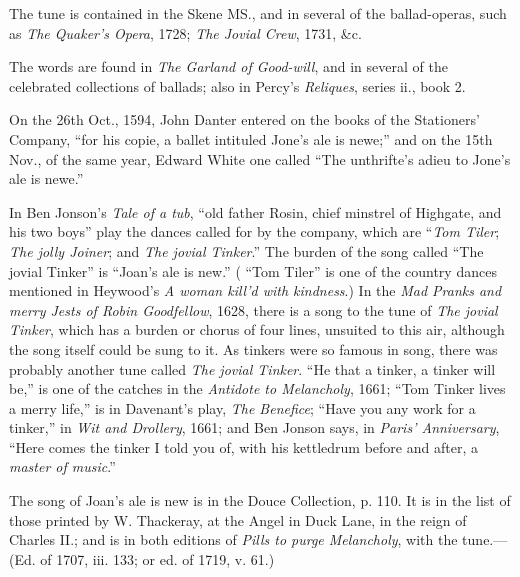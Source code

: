 \pagebreak

The tune is contained in the Skene MS., and in several of the ballad-operas,
such as \textit{The Quaker’s Opera}, 1728; \textit{The Jovial Crew}, 1731, \&c.

The words are found in \textit{The Garland of Good-will}, and in several of the celebrated
collections of ballads; also in Percy’s \textit{Reliques}, series ii., book 2.




On the 26th Oct., 1594, John Danter entered on the books of the Stationers’
Company, “for his copie, a ballet intituled Jone’s ale is newe;” and on the
15th Nov., of the same year, Edward White one called “The unthrifte’s adieu
to Jone’s ale is newe.”

In Ben Jonson’s \textit{Tale of a tub}, “old father Rosin, chief minstrel of Highgate,
and his two boys” play the dances called for by the company, which are “\textit{Tom
Tiler}; \textit{The jolly Joiner}; and \textit{The jovial Tinker}.” The burden of the song called
“The jovial Tinker” is “Joan’s ale is new.” ( “Tom Tiler” is one of the
country dances mentioned in Heywood’s \textit{A woman kill’d with kindness}.) In the
\textit{Mad Pranks and merry Jests of Robin Goodfellow}, 1628, there is a song to the
tune of \textit{The jovial Tinker}, which has a burden or chorus of four lines, unsuited to
this air, although the song itself could be sung to it. As tinkers were so famous
in song, there was probably another tune called \textit{The jovial Tinker}. “He that a
tinker, a tinker will be,” is one of the catches in the \textit{Antidote to Melancholy}, 1661;
“Tom Tinker lives a merry life,” is in Davenant’s play, \textit{The Benefice}; “Have
you any work for a tinker,” in \textit{Wit and Drollery}, 1661; and Ben Jonson says,
in \textit{Paris’ Anniversary}, “Here comes the tinker I told you of, with his kettledrum
before and after, a \textit{master of music}.”

\pagebreak



The song of Joan’s ale is new is in the Douce Collection, p. 110. It is in the
list of those printed by W. Thackeray, at the Angel in Duck Lane, in the reign
of Charles II.; and is in both editions of \textit{Pills to purge Melancholy}, with the
tune.—(Ed. of 1707, iii. 133; or ed. of 1719, v. 61.)

